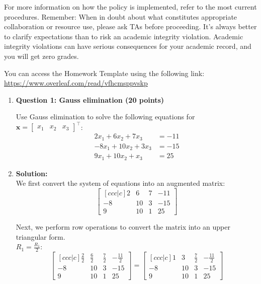 \documentclass[11pt,letterpaper]{article}
\begin{document}
\begin{enumerate}
{\begin{minipage}{0.95\textwidth}
\begin{enumerate}
    For more information on how the policy is implemented, refer to the most current procedures. Remember: When in doubt about what constitutes appropriate collaboration or resource use, please ask TAs before proceeding. It's always better to clarify expectations than to risk an academic integrity violation. Academic integrity violations can have serious consequences for your academic record, and you will get zero grades.
\end{enumerate}



You can access the Homework Template using the following link: \url{https://www.overleaf.com/read/vfhcmsppvskp}
\end{minipage}}

\clearpage
\begin{enumerate}
\item[] \textbf{Question 1: Gauss elimination (20 points)} 

Use Gauss elimination to solve the following equations for $\mathbf{x}=\begin{bmatrix}x_1 & x_2 & x_3\end{bmatrix}^\top$:
\begin{align*}
2x_1 + 6x_2 +7x_3 &= -11 \\
-8x_1  +10x_2 + 3x_3 &= - 15 \\
9x_1 + 10x_2 + x_3 &= 25
\end{align*}

\item[] \textbf{Solution:} \\
We first convert the system of equations into an augmented matrix:
\[\begin{bmatrix}[ccc|c]
2 & 6 & 7 & -11 \\
-8 & 10 & 3 & -15 \\
9 & 10 & 1 & 25
\end{bmatrix}\]

Next, we perform row operations to convert the matrix into an upper triangular form. \\
$R_1 = \frac{R_1}{2}$:
\[\begin{bmatrix}[ccc|c]
\frac{2}{2} & \frac{6}{2} & \frac{7}{2} & -\frac{11}{2} \\
-8 & 10 & 3 & -15 \\
9 & 10 & 1 & 25
\end{bmatrix} = 
\begin{bmatrix}[ccc|c]
1 & 3 & \frac{7}{2} & -\frac{11}{2} \\
-8 & 10 & 3 & -15 \\
9 & 10 & 1 & 25
\end{bmatrix}\]


\end{enumerate}
\end{enumerate}
\end{document}
